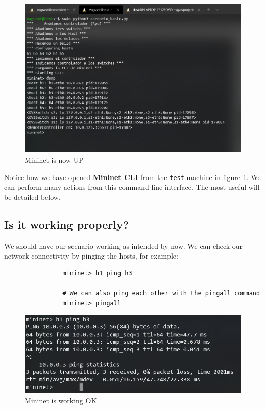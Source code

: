 \documentclass[12pt]{report}
\begin{document}
			\begin{figure}
				\centering
				\includegraphics[scale = 1]{mininet_up.png}
				\caption{Mininet is now UP}
				\label{f:mininet_up}
			\end{figure}

			Notice how we have opened \textbf{Mininet CLI} from the \texttt{test} machine in figure \ref{f:mininet_up}. We can perform many actions from this command line interface. The most useful will be detailed below.

		\subsection{Is it working properly?}
			We should have our scenario working as intended by now. We can check our network connectivity by pinging the hosts, for example:

			\begin{verbatim}
				mininet> h1 ping h3

				# We can also ping each other with the pingall command
				mininet> pingall
			\end{verbatim}

			\begin{figure}
				\centering
				\includegraphics[scale = 1]{ping_ok.png}
				\caption{Mininet is working OK}
				\label{f:ping_ok}
			\end{figure}
\end{document}
